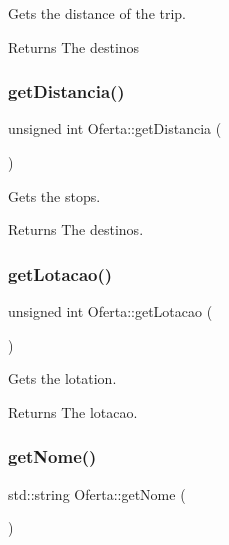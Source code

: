 Gets the distance of the trip. 

\begin{DoxyReturn}{Returns}
The destinos 
\end{DoxyReturn}
\mbox{\label{classOferta_a0d07f80f25f4fb21c0819c3e25d67fb9}} 
\subsubsection{\texorpdfstring{get\+Distancia()}{getDistancia()}}
{\footnotesize\ttfamily unsigned int Oferta\+::get\+Distancia (\begin{DoxyParamCaption}{ }\end{DoxyParamCaption})\hspace{0.3cm}{\ttfamily [inline]}}



Gets the stops. 

\begin{DoxyReturn}{Returns}
The destinos. 
\end{DoxyReturn}
\mbox{\label{classOferta_a9c8fbec401e54e590828209931bf25b0}} 
\subsubsection{\texorpdfstring{get\+Lotacao()}{getLotacao()}}
{\footnotesize\ttfamily unsigned int Oferta\+::get\+Lotacao (\begin{DoxyParamCaption}{ }\end{DoxyParamCaption})\hspace{0.3cm}{\ttfamily [inline]}}



Gets the lotation. 

\begin{DoxyReturn}{Returns}
The lotacao. 
\end{DoxyReturn}
\mbox{\label{classOferta_a16da38d9f369b000cb544c34200707b8}} 
\subsubsection{\texorpdfstring{get\+Nome()}{getNome()}}
{\footnotesize\ttfamily std\+::string Oferta\+::get\+Nome (\begin{DoxyParamCaption}{ }\end{DoxyParamCaption})\hspace{0.3cm}{\ttfamily [inline]}}



